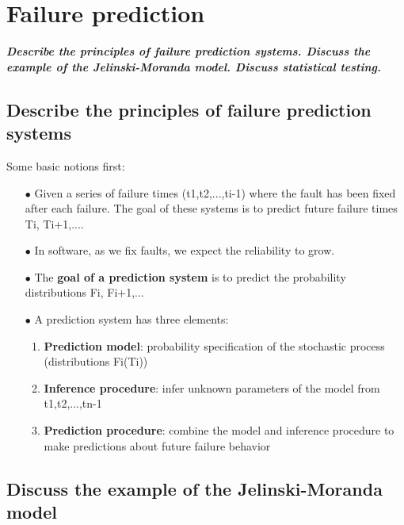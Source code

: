 \documentclass{article}
\begin{document}
\newpage
\section{Failure prediction}
\textbf{\textit{Describe the principles of failure prediction systems. Discuss the example of the Jelinski-Moranda model. Discuss statistical testing.}}

\subsection{Describe the principles of failure prediction systems}

Some basic notions first:
\begin{itemize}
    \item [$\bullet$]Given a series of failure times (t1,t2,...,ti-1) where
the fault has been fixed after each failure. The goal
of these systems is to predict future failure times Ti,
Ti+1,....
    \item [$\bullet$]In software, as we fix faults, we expect the reliability
to grow.
    \item [$\bullet$]The\textbf{ goal of a prediction system} is to predict the probability distributions Fi, Fi+1,...
    \item [$\bullet$]A prediction system has three elements:
    \begin{enumerate}
        \item \textbf{Prediction model}:  probability specification of the stochastic process (distributions Fi(Ti))
        \item \textbf{Inference procedure}: infer unknown parameters of the model from t1,t2,...,tn-1
        \item \textbf{Prediction procedure}: combine the model and inference procedure to make predictions about future
failure behavior
    \end{enumerate}
\end{itemize}

\subsection{Discuss the example of the Jelinski-Moranda model}
\end{document}

